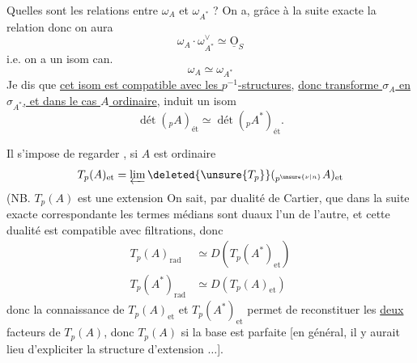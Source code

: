 Quelles sont les relations entre $\omega_A$ et $\omega_{A^*}$ ? On a, grâce à la suite exacte
la relation
donc on aura
\[
\omega_A\cdot\omega_{A^*}^\vee\simeq\underline{\mathrm O}_S
\]
i.e. on a un isom can.
\[
\omega_A\simeq\omega_{A^*}
\]
Je dis que \uline{cet isom est compatible avec les $p^{-1}$-structures}, \uline{donc transforme $\sigma_A$ en $\sigma_{A^*}$, et dans le cas $A$ ordinaire}, induit un isom
\[
\operatorname{\text{dét}}({}_pA)_{\text{ét}}\simeq\operatorname{\text{dét}}({}_pA^*)_{\text{ét}}.
\]

Il s'impose de regarder , si $A$ est ordinaire
\[
T_p(A)_{\text{et}}=\varprojlim\deleted{\unsure{T_p}}({}_{p^{\unsure{\nu|n}}}A)_{\text{et}}
\]
(NB. $T_p(A)$ est une extension
On sait, par dualité de Cartier, que dans la suite exacte correspondante
les termes médians sont duaux l'un de l'autre, et  cette dualité est compatible avec filtrations, donc
\[
\begin{aligned}
T_p(A)_{\mathrm{rad}}&\simeq D(T_p(A^*)_{\text{et}})\\
T_p(A^*)_{\mathrm{rad}}&\simeq D(T_p(A)_{\text{et}})
\end{aligned}
\]
donc la connaissance de $T_p(A)_{\text{et}}$ et $T_p(A^*)_{\text{et}}$ permet de reconstituer les \uline{deux} facteurs de $T_p(A)$, donc $T_p(A)$ si la base est parfaite [en général, il y aurait lieu d'expliciter la structure d'extension $\ldots$].

